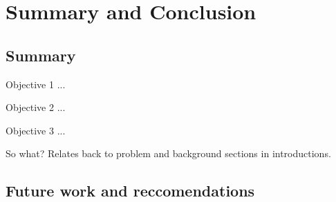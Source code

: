 \graphicspath{{conclusion/fig/}}

\chapter{Summary and Conclusion}
\label{chap:conclusion}

\section{Summary}
Objective 1 ...

Objective 2 ...

Objective 3 ...

So what? Relates back to problem and background sections in introductions.

\section{Future work and reccomendations}